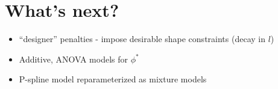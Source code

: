 \documentclass[12pt]{article}
\newcommand{\ms}{\scriptscriptstyle}
\theoremstyle{definition}
\begin{document}
 



 
\section{What's next?}

\begin{itemize}
\item ``designer'' penalties - impose desirable shape constraints (decay in $l$)
\item Additive, ANOVA models for $\phi^*$
\item P-spline model reparameterized as mixture models
\end{itemize}

 



%
%
% 
\end{document}
